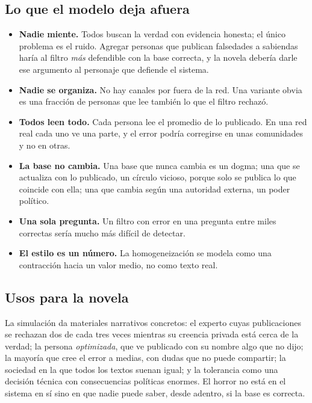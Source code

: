 \documentclass[11pt,a4paper]{article}
\begin{document}
\subsection{Lo que el modelo deja afuera}

\begin{itemize}
\item \textbf{Nadie miente.} Todos buscan la verdad con evidencia honesta; el único problema es el ruido. Agregar personas que publican falsedades a sabiendas haría al filtro \emph{más} defendible con la base correcta, y la novela debería darle ese argumento al personaje que defiende el sistema.
\item \textbf{Nadie se organiza.} No hay canales por fuera de la red. Una variante obvia es una fracción de personas que lee también lo que el filtro rechazó.
\item \textbf{Todos leen todo.} Cada persona lee el promedio de lo publicado. En una red real cada uno ve una parte, y el error podría corregirse en unas comunidades y no en otras.
\item \textbf{La base no cambia.} Una base que nunca cambia es un dogma; una que se actualiza con lo publicado, un círculo vicioso, porque solo se publica lo que coincide con ella; una que cambia según una autoridad externa, un poder político.
\item \textbf{Una sola pregunta.} Un filtro con error en una pregunta entre miles correctas sería mucho más difícil de detectar.
\item \textbf{El estilo es un número.} La homogeneización se modela como una contracción hacia un valor medio, no como texto real.
\end{itemize}

\subsection{Usos para la novela}

La simulación da materiales narrativos concretos: el experto cuyas publicaciones se rechazan dos de cada tres veces mientras su creencia privada está cerca de la verdad; la persona \emph{optimizada}, que ve publicado con su nombre algo que no dijo; la mayoría que cree el error a medias, con dudas que no puede compartir; la sociedad en la que todos los textos suenan igual; y la tolerancia como una decisión técnica con consecuencias políticas enormes. El horror no está en el sistema en sí sino en que nadie puede saber, desde adentro, si la base es correcta.
\end{document}
